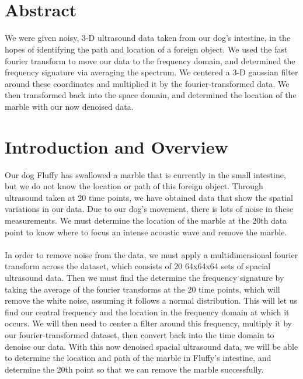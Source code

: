 \documentclass{article}
\title{
    \textmd{\textbf{\text{ } \hmwkTitle}}\\
}
\author{\hmwkAuthorName}
\date{}
\begin{document}
\maketitle

\section*{\fontsize{19}{15}\selectfont Abstract}
	We were given noisy, 3-D ultrasound data taken from our dog's intestine, in the hopes of identifying the path and location of a foreign object. We used the fast fourier transform to move our data to the frequency domain, and determined the frequency signature via averaging the spectrum. We centered a 3-D gaussian filter around these coordinates and multiplied it by the fourier-transformed data. We then transformed back into the space domain, and determined the location of the marble with our now denoised data.
\section*{\fontsize{19}{15}\selectfont Introduction and Overview}
	Our dog Fluffy has swallowed a marble that is currently in the small intestine, but we do not know the location or path of this foreign object. Through ultrasound taken at 20 time points, we have obtained data that show the spatial variations in our data. Due to our dog's movement, there is lots of noise in these measurements. We must determine the location of the marble at the 20th data point to know where to focus an intense acoustic wave and remove the marble. \\ \\
In order to remove noise from the data, we must apply a multidimensional fourier transform across the dataset, which consists of 20 64x64x64 sets of spacial ultrasound data. Then we must find the determine the frequency signature by taking the average of the fourier transforms at the 20 time points, which will remove the white noise, assuming it follows a normal distribution. This will let us  find our central frequency and the location in the frequency domain at which it occurs. We will then need to center a filter around this frequency, multiply it by our fourier-transformed dataset, then convert back into the time domain to denoise our data. With this now denoised spacial ultrasound data, we will be able to determine the location and path of the marble in Fluffy's intestine, and determine the 20th point so that we can remove the marble successfully.
\end{document}
